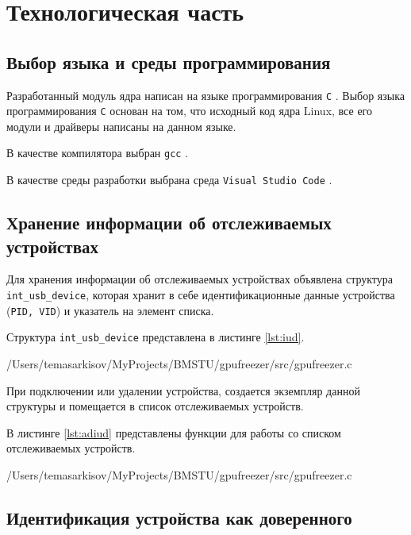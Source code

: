 \chapter{Технологическая часть}

\section{Выбор языка и среды программирования}

Разработанный модуль ядра написан на языке программирования \texttt{C} \cite{c-language}. Выбор языка программирования \texttt{С} основан на том, что исходный код ядра Linux, все его модули и драйверы написаны на данном языке.

В качестве компилятора выбран \texttt{gcc} \cite{gcc}.

В качестве среды разработки выбрана среда \texttt{Visual Studio Code} \cite{vscode}.

\section{Хранение информации об отслеживаемых устройствах}

Для хранения информации об отслеживаемых устройствах объявлена структура \texttt{int\_usb\_device}, которая хранит в себе идентификационные данные устройства (\texttt{PID, VID}) и указатель на элемент списка.

Структура \texttt{int\_usb\_device} представлена в листинге \ref{lst:iud}.

\begin{lstinputlisting}[
	caption={Структура \texttt{int\_usb\_device}},
	label={lst:iud},
	style={c},
	linerange={9-14},
	]{/Users/temasarkisov/MyProjects/BMSTU/gpufreezer/src/gpufreezer.c}
\end{lstinputlisting}

При подключении или удалении устройства, создается экземпляр данной структуры и помещается в список отслеживаемых устройств.

\newpage
В листинге \ref{lst:adiud} представлены функции для работы со списком отслеживаемых устройств.

\begin{lstinputlisting}[
	caption={Функции для работы со списком отслеживаемых устройств},
	label={lst:adiud},
	style={c},
	linerange={83-104},
	]{/Users/temasarkisov/MyProjects/BMSTU/gpufreezer/src/gpufreezer.c}
\end{lstinputlisting}

\section{Идентификация устройства как доверенного}

